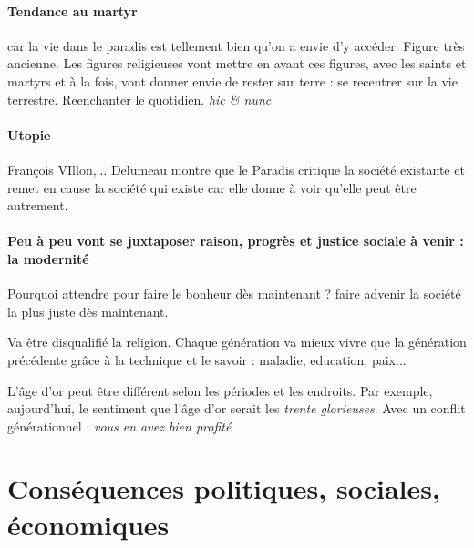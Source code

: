     \paragraph{Tendance au martyr} car la vie dans le paradis est tellement bien qu'on a envie d'y accéder. Figure très ancienne. Les figures religieuses vont mettre en avant ces figures, avec les saints et martyrs et à la fois, vont donner envie de rester sur terre : se recentrer sur la vie terrestre. Reenchanter le quotidien. \textit{hic \& nunc}
    
    \paragraph{Utopie} François VIllon,... Delumeau montre que le Paradis critique la société existante et remet en cause la société qui existe car elle donne à voir qu'elle peut être autrement.
    
    \paragraph{Peu à peu vont se juxtaposer raison, progrès et justice sociale à venir : la modernité} Pourquoi attendre pour faire le bonheur dès maintenant ? faire advenir la société la plus juste dès maintenant.
    
    Va être disqualifié la religion. Chaque génération va mieux vivre que la génération précédente grâce à la technique et le savoir : maladie, education, paix...
    
    
    \begin{Ex}
    L'âge d'or peut être différent selon les périodes et les endroits. 
    Par exemple, aujourd'hui, le sentiment que l'âge d'or serait les \textit{trente glorieuses}. Avec un conflit générationnel : \textit{vous en avez bien profité}
    \end{Ex}
    
    
\section{Conséquences politiques, sociales, économiques} 


